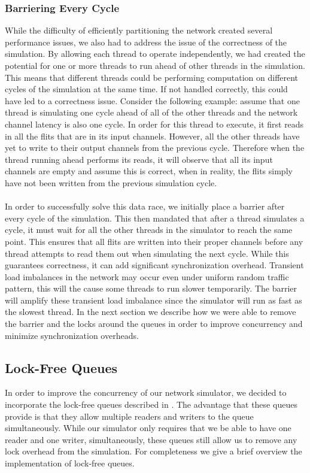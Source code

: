 \documentclass[twocolumn]{article}
\begin{document}
\subsubsection{Barriering Every Cycle}
While the difficulty of efficiently partitioning the network created
several performance issues, we also had to address the issue of the
correctness of the simulation.  By allowing each thread to operate
independently, we had created the potential for one or more threads to run
ahead of other threads in the simulation.  This means that different
threads could be performing computation on different cycles of the
simulation at the same time.  If not handled correctly, this could have
led to a correctness issue.  Consider the following example: assume that
one thread is simulating one cycle ahead of all of the other threads and the network channel latency is also one cycle.  In
order for this thread to execute, it first reads in all the flits that are
in its input channels.  However, all the other threads have yet to write
to their output channels from the previous cycle.  Therefore when the thread running ahead
performs its reads, it will observe that all its input channels are empty
and assume this is correct, when in reality, the flits simply have not
been written from the previous simulation cycle.\\
~\\
In order to successfully solve this data race, we initially place a
barrier after every cycle of the simulation.  This then mandated that
after a thread simulates a cycle, it must wait for all the other threads
in the simulator to reach the same point.  This ensures that all flits are
written into their proper channels before any thread attempts to read them
out when simulating the next cycle.  While this guarantees correctness, it
can add significant
synchronization overhead. Transient load imbalances in the network may occur even under uniform random traffic pattern, this will the cause some threads to run slower temporarily. The barrier will amplify these transient load imbalance since the simulator will run as fast as the slowest thread. In the next section we describe how we were
able to remove the barrier and the locks around the queues in order to
improve concurrency and minimize synchronization overheads.

\subsection{Lock-Free Queues}
In order to improve the concurrency of our network simulator, we decided
to incorporate the lock-free queues described in \cite{LF}.  The advantage
that these queues provide is that they allow multiple readers and writers
to the queue simultaneously.  While our simulator only requires that we
be able to have one reader and one writer, simultaneously, these queues
still allow us to remove any lock overhead from the simulation.  For
completeness we give a brief overview the implementation of lock-free
queues.
\end{document}
